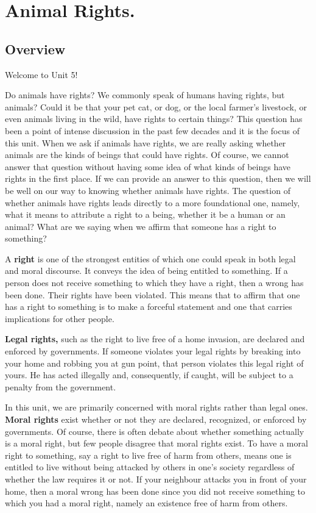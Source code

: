 \documentclass[
]{book}
\begin{document}
\hypertarget{animal-rights.}{%
\chapter{Animal Rights.}\label{animal-rights.}}

\hypertarget{overview-4}{%
\section*{Overview}\label{overview-4}}

Welcome to Unit 5!

Do animals have rights? We commonly speak of humans having rights, but animals? Could it be that your pet cat, or dog, or the local farmer's livestock, or even animals living in the wild, have rights to certain things? This question has been a point of intense discussion in the past few decades and it is the focus of this unit. When we ask if animals have rights, we are really asking whether animals are the kinds of beings that could have rights. Of course, we cannot answer that question without having some idea of what kinds of beings have rights in the first place. If we can provide an answer to this question, then we will be well on our way to knowing whether animals have rights. The question of whether animals have rights leads directly to a more foundational one, namely, what it means to attribute a right to a being, whether it be a human or an animal? What are we saying when we affirm that someone has a right to something?

A \textbf{right} is one of the strongest entities of which one could speak in both legal and moral discourse. It conveys the idea of being entitled to something. If a person does not receive something to which they have a right, then a wrong has been done. Their rights have been violated. This means that to affirm that one has a right to something is to make a forceful statement and one that carries implications for other people.

\textbf{Legal rights,} such as the right to live free of a home invasion, are declared and enforced by governments. If someone violates your legal rights by breaking into your home and robbing you at gun point, that person violates this legal right of yours. He has acted illegally and, consequently, if caught, will be subject to a penalty from the government.

In this unit, we are primarily concerned with moral rights rather than legal ones. \textbf{Moral rights} exist whether or not they are declared, recognized, or enforced by governments. Of course, there is often debate about whether something actually is a moral right, but few people disagree that moral rights exist. To have a moral right to something, say a right to live free of harm from others, means one is entitled to live without being attacked by others in one's society regardless of whether the law requires it or not. If your neighbour attacks you in front of your home, then a moral wrong has been done since you did not receive something to which you had a moral right, namely an existence free of harm from others.
\end{document}
